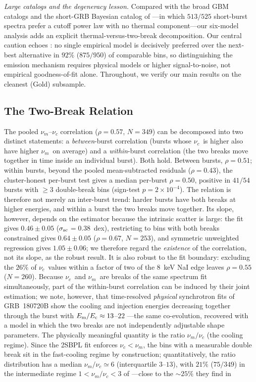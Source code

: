 \documentclass[twocolumn]{aastex631}
\newcommand{\nuc}{\ensuremath{\nu_c}}
\newcommand{\num}{\ensuremath{\nu_m}}
\newcommand{\ssc}{\ensuremath{\sigma_{\rm sc}}}
\begin{document}
\emph{Large catalogs and the degeneracy lesson.}
Compared with the broad GBM catalogs \citep{Kaneko2006,Gruber2014,Yu2016} and the
short-GRB Bayesian catalog of \citet{Burgess2019}---in which $513/525$ short-burst
spectra prefer a cutoff power law with no thermal component---our six-model
analysis adds an explicit thermal-versus-two-break decomposition. Our central
caution echoes \citet{Basak2014}: no single empirical model is decisively
preferred over the next-best alternative in $92\%$ ($875/950$) of comparable
bins, so distinguishing the emission mechanism requires physical models
\citep{Burgess2014b} or higher signal-to-noise, not empirical goodness-of-fit
alone. Throughout, we verify our main results on the cleanest (Gold) subsample.

\subsection{The Two-Break Relation} \label{sec:disc-breaks}
The pooled $\num$--$\nuc$ correlation ($\rho=0.57$, $N=349$) can be decomposed
into two distinct statements: a \emph{between}-burst correlation (bursts whose
\nuc\ is higher also have higher \num\ on average) and a \emph{within}-burst
correlation (the two breaks move together in time inside an individual burst).
Both hold. Between bursts, $\rho=0.51$; within bursts, beyond the pooled
mean-subtracted residuals ($\rho=0.43$), the cluster-honest per-burst test
gives a median per-burst $\rho=0.50$, positive in $41/54$ bursts with
$\ge$$3$ double-break bins (sign-test $p=2\times10^{-4}$). The relation is
therefore not merely an inter-burst trend: harder bursts have both breaks at
higher energies, and within a burst the two breaks move together. Its slope,
however, depends on the estimator because the intrinsic scatter is large: the
\citet{DAgostini2005} fit gives $0.46\pm0.05$ (\ssc$=0.38$~dex), restricting to
bins with both breaks constrained gives $0.64\pm0.05$ ($\rho=0.67$, $N=253$),
and symmetric unweighted regression gives $1.05\pm0.06$; we therefore regard
the \emph{existence} of the correlation, not its slope, as the robust result.
It is also robust to the fit boundary: excluding the $26\%$ of \nuc\ values
within a factor of two of the 8~keV NaI edge leaves $\rho=0.55$ ($N=260$).
Because \nuc\ and \num\ are breaks of the same spectrum fit simultaneously,
part of the within-burst correlation can be induced by their joint estimation;
we note, however, that time-resolved \emph{physical} synchrotron fits of
GRB~180720B show the cooling and injection energies decreasing together
through the burst with $E_{\rm m}/E_{\rm c}\approx13$--$22$
\citep{Ronchi2020}---the same co-evolution, recovered with a model in which
the two breaks are not independently adjustable shape parameters. The
physically meaningful quantity is the ratio $\num/\nuc$ (the cooling
regime). Since the 2SBPL fit enforces $\nuc<\num$, the bins with a measurable
double break sit in the fast-cooling regime by construction; quantitatively,
the ratio distribution has a median $\num/\nuc\simeq6$ (interquartile
$3$--$13$), with $21\%$ ($75/349$) in the intermediate regime
$1<\num/\nuc<3$ of \citet{Mei2025}---close to the $\sim$$25\%$ they find in
\end{document}

